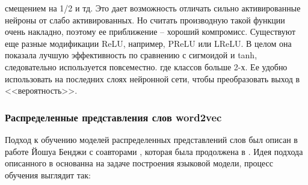 смещением на 1/2 и тд. Это дает возможность отличать сильно активированные нейроны от слабо активированных.
Но считать производную такой функции очень накладно, поэтому ее приближение -- хороший компромисс. Существуют
еще разные модификации ReLU, например, PReLU или LReLU. В целом она показала лучшую эффективность по сравнению
с сигмоидой и tanh, следовательно используется повсеместно.
%
где классов больше 2-х. Ее удобно использовать на последних слоях нейронной сети, чтобы преобразовать выход в
<<вероятность>>.










































\subsubsection{Распределенные представления слов word2vec}

Подход к обучению моделей распределенных представлений слов был описан в работе Йошуа Бенджи с соавторами
\cite{Bengio}, которая была продолжена в \cite{Zhou}. Идея подхода описанного в \cite{Bengio} основанна на
задаче построения языковой модели, процесс обучения выглядит так:

